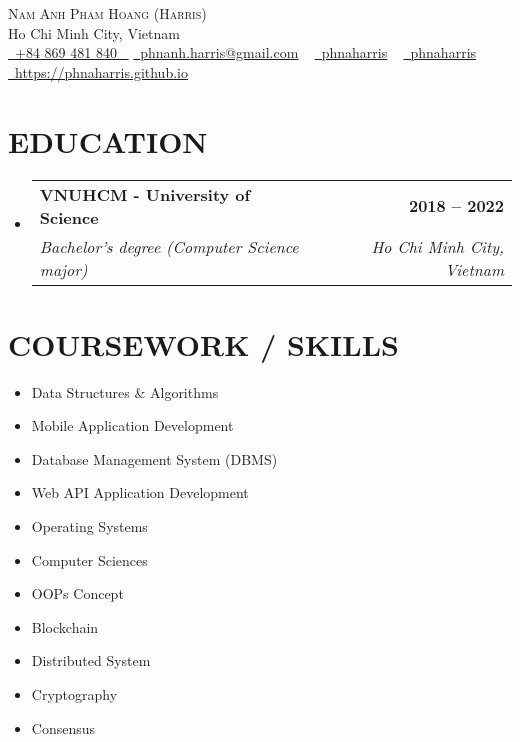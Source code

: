 \documentclass[letterpaper,11pt]{article}
\makeatletter
\newcommand{\resumeItem}[1]{
	\item\small{
		{#1 \vspace{-2pt}}
	}
}
\newcommand{\resumeSubheading}[4]{
	\vspace{-2pt}\item
	\begin{tabular*}{1.0\textwidth}[t]{l@{\extracolsep{\fill}}r}
		\textbf{\large#1} & \textbf{\small #2} \\
		\textit{\large#3} & \textit{\small #4} \\

	\end{tabular*}\vspace{-7pt}
}
\newcommand{\resumeSubHeadingListStart}{\begin{itemize}[leftmargin=0.0in, label={}]}
\newcommand{\resumeSubHeadingListEnd}{\end{itemize}}
\newcommand{\resumeItemListStart}{\begin{itemize}}
\newcommand{\resumeItemListEnd}{\end{itemize}\vspace{-5pt}}
\makeatother
\begin{document}
\begin{center}
	{\Huge \scshape Nam Anh Pham Hoang (Harris)} \\ \vspace{1pt}
	Ho Chi Minh City, Vietnam \\ \vspace{1pt}
	\small \href{tel:+84 869 481 840}{ \raisebox{-0.1\height}\faPhone\ \underline{+84 869 481 840} ~}
	\href{mailto:phnanh.harris@gmail.com}{\raisebox{-0.2\height}\faEnvelope\  \underline{phnanh.harris@gmail.com}} ~
	\href{https://linkedin.com/in/phnaharris}{\raisebox{-0.2\height}\faLinkedinSquare\ \underline{phnaharris}}  ~
	\href{https://github.com/phnaharris}{\raisebox{-0.2\height}\faGithub\ \underline{phnaharris}} ~
	\href{https://phnaharris.github.io}{\raisebox{-0.2\height}\faGlobe\  \underline{https://phnaharris.github.io}} ~
\end{center}
\vspace{-8pt}


\vspace{0pt}
\section{EDUCATION}
\vspace{5pt}
\resumeSubHeadingListStart
\resumeSubheading
{VNUHCM - University of Science}{2018 -- 2022}
{Bachelor's degree (Computer Science major)}{Ho Chi Minh City, Vietnam}
\resumeSubHeadingListEnd
\vspace{-8pt}


\section{COURSEWORK / SKILLS}
\begin{multicols}{4}
	\resumeItemListStart
	\resumeItem{Data Structures \& Algorithms}
	\resumeItem{Mobile Application Development}
	\resumeItem{Database Management System (DBMS)}
	\resumeItem{Web API Application Development}
	\resumeItem{Operating Systems}
	\resumeItem{Computer Sciences}
	\resumeItem{OOPs Concept}
	\resumeItem{Blockchain}
	\resumeItem{Distributed System}
	\resumeItem{Cryptography}
	\resumeItem{Consensus}
	\resumeItemListEnd
\end{multicols}


\end{document}
